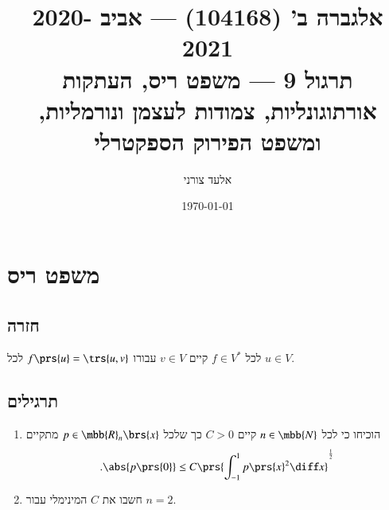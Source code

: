 \documentclass[a4paper,10pt,oneside,openany]{article}
\title{
אלגברה ב' (104168) \textenglish{---} אביב 2020-2021
\\
תרגול 9 \textenglish{---} משפט ריס, העתקות אורתוגונליות, צמודות לעצמן ונורמליות, ומשפט הפירוק הספקטרלי
}
\author{אלעד צורני}
\date{\today}
\begin{document}
\maketitle

\section{משפט ריס}

\subsection{חזרה}

\begin{theorem}[ריס]
לכל
$f \in V^*$
קיים
$v \in V$
עבורו
$f\prs{u} = \trs{u,v}$
לכל
$u \in V$.
\end{theorem}

\subsection{תרגילים}

\begin{exercise}
\begin{enumerate}
\item הוכיחו כי לכל
$n \in \mbb{N}$
קיים
$C > 0$
כך שלכל
$p \in \mbb{R}_n\brs{x}$
מתקיים
\[\text{.} \abs{p\prs{0}} \leq C \prs{\int_{-1}^1 p\prs{x}^2 \diff x}^{\frac{1}{2}}\]

\item חשבו את
$C$
המינימלי עבור
$n=2$.
\end{enumerate}
\end{exercise}
\end{document}
